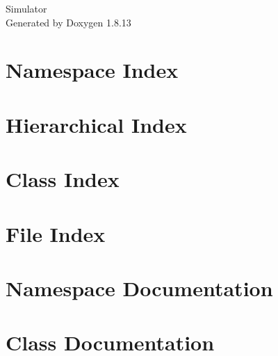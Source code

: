 \documentclass[twoside]{book}
\newcommand{\+}{\discretionary{\mbox{\scriptsize$\hookleftarrow$}}{}{}}
\newcommand{\clearemptydoublepage}{%
  \newpage{\pagestyle{empty}\cleardoublepage}%
}
\begin{document}
\hypersetup{pageanchor=false,
             bookmarksnumbered=true,
             pdfencoding=unicode
            }
\begin{titlepage}
\vspace*{7cm}
\begin{center}%
{\Large Simulator }\\
\vspace*{1cm}
{\large Generated by Doxygen 1.8.13}\\
\end{center}
\end{titlepage}
\clearemptydoublepage
{}
\tableofcontents
\clearemptydoublepage
{}
\hypersetup{pageanchor=true}

\chapter{Namespace Index}

\chapter{Hierarchical Index}

\chapter{Class Index}

\chapter{File Index}

\chapter{Namespace Documentation}


\chapter{Class Documentation}




































\end{document}

